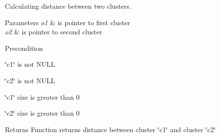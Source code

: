 Calculating distance between two clusters. 


\begin{DoxyParams}{Parameters}
{\em o1} & is pointer to first cluster\\
\hline
{\em o2} & is pointer to second cluster\\
\hline
\end{DoxyParams}
\begin{DoxyPrecond}{Precondition}

\begin{DoxyItemize}
\item \char`\"{}c1\char`\"{} is not N\+U\+LL
\item \char`\"{}c2\char`\"{} is not N\+U\+LL
\item \char`\"{}c1\char`\"{} size is greater than 0
\item \char`\"{}c2\char`\"{} size is greater than 0
\end{DoxyItemize}
\end{DoxyPrecond}
\begin{DoxyReturn}{Returns}
Function returns distance between cluster \char`\"{}c1\char`\"{} and cluster \char`\"{}c2\char`\"{} 
\end{DoxyReturn}
